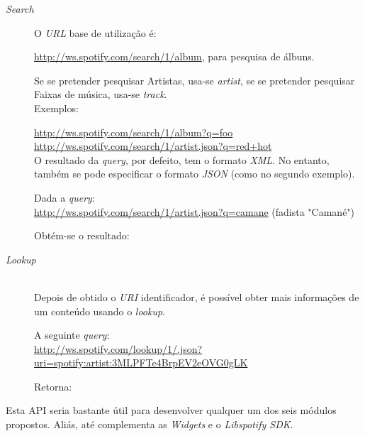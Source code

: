       \begin{description}
        \item[\emph{Search}] \hfill

          O \emph{URL} base de utilização é:

          \url{http://ws.spotify.com/search/1/album}, para pesquisa de álbuns.

          Se se pretender pesquisar Artistas, usa-se \emph{artist}, se se pretender pesquisar Faixas de música, usa-se \emph{track}. \\

          Exemplos:

          \url{http://ws.spotify.com/search/1/album?q=foo} \\
          \url{http://ws.spotify.com/search/1/artist.json?q=red+hot} \\

          O resultado da \emph{query}, por defeito, tem o formato \emph{XML}. No entanto, também se pode especificar o formato \emph{JSON} (como no segundo exemplo).

          Dada a \emph{query}: \\
          \url{http://ws.spotify.com/search/1/artist.json?q=camane} (fadista "Camané")

          Obtém-se o resultado:

          

        \item[\emph{Lookup}] \hfill \\
          Depois de obtido o \emph{URI} identificador, é possível obter mais informações de um conteúdo usando o \emph{lookup}.

          A seguinte \emph{query}: \\
          \url{http://ws.spotify.com/lookup/1/.json?uri=spotify:artist:3MLPFTe4BrpEV2eOVG0gLK}

          Retorna:

          

      \end{description}

      Esta API seria bastante útil para desenvolver qualquer um dos seis módulos propostos.
      Aliás, até complementa as \emph{Widgets} e o \emph{Libspotify SDK}.


